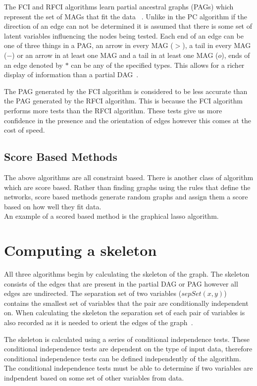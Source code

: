 \documentclass{UoYCSproject}
\begin{document}
The FCI and RFCI algorithms learn partial ancestral graphs (PAGs) which represent the set of MAGs that fit the data ~\parencite{colombo2012learning}. Unlike in the PC algorithm if the direction of an edge can not be determined it is assumed that there is some set of latent variables influencing the nodes being tested. Each end of an edge can be one of three things in a PAG, an arrow in every MAG ($>$), a tail in every MAG ($-$) or an arrow in at least one MAG and a tail in at least one MAG ($o$), ends of an edge denoted by $*$ can be any of the specified types. This allows for a richer display of information than a partial DAG~\parencite{colombo2012learning}.

The PAG generated by the FCI algorithm is considered to be less accurate than the PAG generated by the RFCI algorithm. This is because the FCI algorithm performs more tests than the RFCI algorithm. These tests give us more confidence in the presence and the orientation of edges however this comes at the cost of speed.
\subsection{Score Based Methods}
The above algorithms are all constraint based. There is another class of algorithm which are score based. Rather than finding graphs using the rules that define the networks, score based methods generate random graphs and assign them a score based on how well they fit data.\\

An example of a scored based method is the graphical lasso algorithm. 

\section{Computing a skeleton}
All three algorithms begin by calculating the skeleton of the graph. The skeleton consists of the edges that are present in the partial DAG or PAG however all edges are undirected. The separation set of two variables ($sepSet(x,y)$) contains the smallest set of variables that the pair are conditionally independent on.  When calculating the skeleton the separation set of each pair of variables is also recorded as it is needed to orient the edges of the graph~\parencite{colombo2012learning, spirtes1991algorithm}.

The skeleton is calculated using a series of conditional independence tests. These conditional independence tests are dependent on the type of input data, therefore conditional independence tests can be defined independently of the algorithm. The conditional independence tests must be able to determine if two variables are indpendent based on some set of other variables from data.
\end{document}

